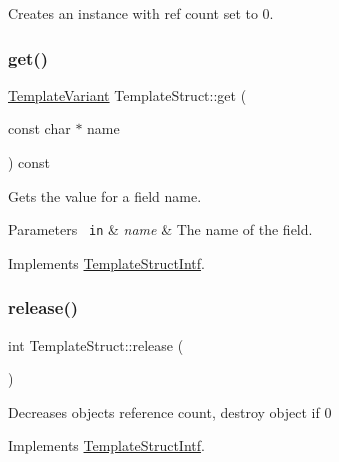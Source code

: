Creates an instance with ref count set to 0. \mbox{\label{class_template_struct_a3186868e4c1ee4cec1d1abcdfb5bac70}} 
\subsubsection{\texorpdfstring{get()}{get()}}
{\footnotesize\ttfamily \mbox{\hyperlink{class_template_variant}{Template\+Variant}} Template\+Struct\+::get (\begin{DoxyParamCaption}\item[{const char $\ast$}]{name }\end{DoxyParamCaption}) const\hspace{0.3cm}{\ttfamily [virtual]}}

Gets the value for a field name. 
\begin{DoxyParams}[1]{Parameters}
\mbox{\texttt{ in}}  & {\em name} & The name of the field. \\
\hline
\end{DoxyParams}


Implements \mbox{\hyperlink{class_template_struct_intf_a3d610cb81b4adbb531ebed3aa3d09b51}{Template\+Struct\+Intf}}.

\mbox{\label{class_template_struct_a4ef2dfe170fe108e52949b9e9c69d41d}} 
\subsubsection{\texorpdfstring{release()}{release()}}
{\footnotesize\ttfamily int Template\+Struct\+::release (\begin{DoxyParamCaption}{ }\end{DoxyParamCaption})\hspace{0.3cm}{\ttfamily [virtual]}}

Decreases object\textquotesingle{}s reference count, destroy object if 0 

Implements \mbox{\hyperlink{class_template_struct_intf_a3dce7dd29d3f66a8080b40578e8a5045}{Template\+Struct\+Intf}}.

\mbox{\label{class_template_struct_a657ed741aec6c31883d86b211ec27e5c}} 
